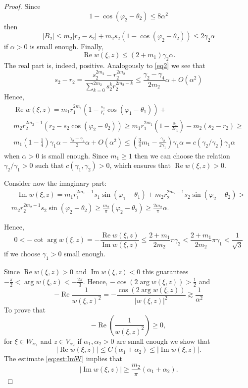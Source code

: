 \documentclass[10pt,a4paper]{amsart}
\newcommand{\IM}{ \mathop{\mathrm{Im}}  }
\newcommand{\RE}{ \mathop{\mathrm{Re}} }
\newcommand{\abs}[1]{\left\vert #1 \right\vert}
\begin{document}
\begin{proof}
	Since $$1-\cos(\varphi_2-\theta_2) \leq 8\alpha^2$$ then 
	$$|B_2|\leq m_2 \abs{r_2-s_2} + m_2 s_2(1-\cos(\varphi_2-\theta_2))\leq {2\gamma_2}\alpha$$
	if $\alpha>0$ is small enough.
	Finally,
	$$\RE{w(\xi,z)} \leq (2+m_1) \gamma_2\alpha.$$
	The real part is, indeed, positive. 
	Analogously to \eqref{eq2} we see that
	\begin{equation} \label{eq3}
	s_2-r_2= \frac{ s_2^{2m_2}-r_2^{2m_2} }{ \sum\limits_{k=0}^{2m_2} s_2^k r_2^{2m_2-k} } \leq \frac{\gamma_2-\gamma_4}{2m_2} \alpha + O(\alpha^2)
	\end{equation}
	Hence,
	\begin{multline*}
		\RE{w(\xi,z)} = m_1 r_1^{2m_1} \left(1-\frac{s_1}{r_1}\cos(\varphi_1-\theta_1)\right)+\\
		m_2 r_2^{2m_2-1}  \left(r_2-s_2\cos(\varphi_2-\theta_2)\right) \geq
		m_1 r_1^{2m_1} \left(1-\frac{s_1}{2r_1}\right) -
		m_2  \left(s_2-r_2\right) \geq\\
		 m_1\left(1-\frac{1}{4}\right)\gamma_1 \alpha -   \frac{\gamma_{2}-\gamma_4}{2} \alpha +O(\alpha^2)
		 \leq \left(\frac{3}{4} m_1-\frac{\gamma_2}{2\gamma_1}\right)\gamma_1\alpha
		  = c(\gamma_2/\gamma_2)\gamma_1\alpha
	\end{multline*}
 	when $\alpha>0$ is small enough. Since $m_1\geq1$ then 
	we can choose the relation $\gamma_2/\gamma_1>0$ such that $c(\gamma_1,\gamma_2)>0$, which ensures that 
	$\RE w(\xi,z) >0$. %
	
	Consider now the imaginary part:
	\begin{multline}\label{eq:est:ImW}
		-\IM{w(\xi,z)} = m_1 r_1^{2m_1-1} s_1 \sin(\varphi_1-\theta_1) + 
		m_2 r_2^{2m_2-1} s_2 \sin(\varphi_2-\theta_2) > \\
		m_2 r_2^{2m_2-1} s_2 \sin(\varphi_2-\theta_2)\geq  \frac{m_2}{\pi}(\varphi_2-\theta_2) \geq\frac{2m_2}{\pi} \alpha.
	\end{multline}
	
	Hence,
	$$0< -\cot\arg w(\xi,z) =-\frac{\RE w(\xi,z)}{\IM w(\xi,z)} \leq \frac{2+m_1}{2m_2} \pi \gamma_2 < \frac{2+m_1}{2m_2} \pi \gamma_1  < \frac{1}{\sqrt{3} }
	$$
	if we choose $\gamma_1>0$ small enough. 
	
	Since $\RE{w(\xi,z)}>0$ and $\IM {w(\xi,z)}<0$ this guarantees $-\frac{\pi}{2}<\arg w(\xi,z)<-\frac{2\pi}{3}.$ Hence, $-\cos(2\arg w(\xi,z))>\frac{1}{2}$ and
	$$
	-\RE \frac{1}{w(\xi,z)^2} =-\frac{\cos(2\arg w(\xi,z))}{\abs{w(\xi,z)}^2} \gtrsim \frac{1}{\alpha^2}
	$$
	To prove that 
	$$-\RE\left(\frac{1}{w(\xi,z)^2}\right) \geq 0 , $$
	for $\xi\in W_{\alpha_1}$ and $z\in V_{\alpha_2}$ if $\alpha_1, \alpha_2>0$ are small enough we show that 
	$$\abs{\RE{w(\xi,z)}} \leq C(\alpha_1+\alpha_2) \leq \abs{\IM w(\xi,z)}.$$
	The estimate \eqref{eq:est:ImW} implies that
	$$ \abs{\IM w(\xi,z)} \geq \frac{m_2}{\pi}(\alpha_1+\alpha_2).$$
	

\end{proof}
\end{document}

